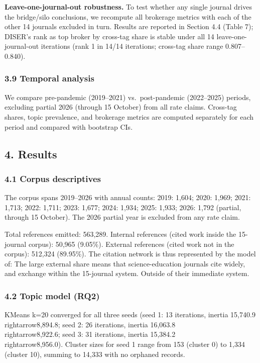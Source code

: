 \documentclass[pdflatex,sn-apa]{sn-jnl}
\begin{document}
\textbf{Leave-one-journal-out robustness.} To test whether any single
journal drives the bridge/silo conclusions, we recompute all brokerage
metrics with each of the other 14 journals excluded in turn. Results are
reported in Section 4.4 (Table 7); DISER's rank as top broker by
cross-tag share is stable under all 14 leave-one-journal-out iterations
(rank 1 in 14/14 iterations; cross-tag share range 0.807--0.840).

\subsubsection{3.9 Temporal analysis}\label{temporal-analysis}

We compare pre-pandemic (2019--2021) vs.~post-pandemic (2022--2025)
periods, excluding partial 2026 (through 15 October) from all rate
claims. Cross-tag shares, topic prevalence, and brokerage metrics are
computed separately for each period and compared with bootstrap CIs.

\subsection{4. Results}\label{results}

\subsubsection{4.1 Corpus descriptives}\label{corpus-descriptives}

The corpus spans 2019--2026 with annual counts: 2019: 1,604; 2020:
1,969; 2021: 1,713; 2022: 1,711; 2023: 1,677; 2024: 1,934; 2025: 1,933;
2026: 1,792 (partial, through 15 October). The 2026 partial year is
excluded from any rate claim.

Total references emitted: 563,289. Internal references (cited work
inside the 15-journal corpus): 50,965 (9.05\%). External references
(cited work not in the corpus): 512,324 (89.95\%). The citation network
is thus represented by the model of: The large external share means that
science-education journals cite widely, and exchange within the
15-journal system. Outside of their immediate system.

\subsubsection{4.2 Topic model (RQ2)}\label{topic-model-rq2}

KMeans k=20 converged for all three seeds (seed 1: 13 iterations,
inertia 15,740.9\\rightarrow8,894.8; seed 2: 26 iterations, inertia
16,063.8\\rightarrow8,922.6; seed 3: 31 iterations, inertia 15,384.2\\rightarrow8,956.0).
Cluster sizes for seed 1 range from 153 (cluster 0) to 1,334 (cluster
10), summing to 14,333 with no orphaned records.
\end{document}
